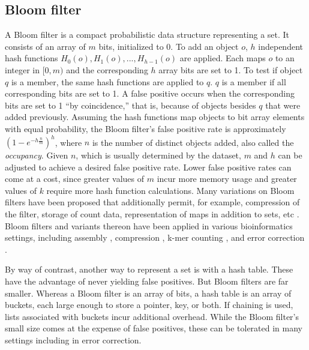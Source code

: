 \documentclass[10pt]{article}
\begin{document}
\subsection*{Bloom filter}
A Bloom filter \cite{bloom1970space} is a compact probabilistic data structure representing a set.  It consists of an array of $m$ bits, initialized to 0.  To add an object $o$, $h$ independent hash functions $H_0(o), H_1(o),...,H_{h-1}(o)$ are applied.  Each maps $o$ to an integer in $[0, m)$ and the corresponding $h$ array bits are set to 1. To test if object $q$ is a member, the same hash functions are applied to $q$.  $q$ is a member if all corresponding bits are set to 1.  A false positive occurs when the corresponding bits are set to 1 ``by coincidence,'' that is, because of objects besides $q$ that were added previously.  Assuming the hash functions map objects to bit array elements with equal probability, the Bloom filter's false positive rate is approximately $(1-e^{-h\frac{n}{m}})^h$, where $n$ is the number of distinct objects added, also called the \emph{occupancy}.  Given $n$, which is usually determined by the dataset, $m$ and $h$ can be adjusted to achieve a desired false positive rate.  Lower false positive rates can come at a cost, since greater values of $m$ incur more memory usage and greater values of $k$ require more hash function calculations.  Many variations on Bloom filters have been proposed that additionally permit, for example, compression of the filter, storage of count data, representation of maps in addition to sets, etc \cite{tarkoma2012theory}.  Bloom filters and variants thereon have been applied in various bioinformatics settings, including assembly \cite{pell2012scaling}, compression \cite{jones2012compression}, k-mer counting \cite{melsted2011efficient}, and error correction \cite{shi2010parallel}.

By way of contrast, another way to represent a set is with a hash table.  These have the advantage of never yielding false positives.  But Bloom filters are far smaller.  Whereas a Bloom filter is an array of bits, a hash table is an array of buckets, each large enough to store a pointer, key, or both.  If chaining is used, lists associated with buckets incur additional overhead.  While the Bloom filter's small size comes at the expense of false positives, these can be tolerated in many settings including in error correction.
\end{document}
